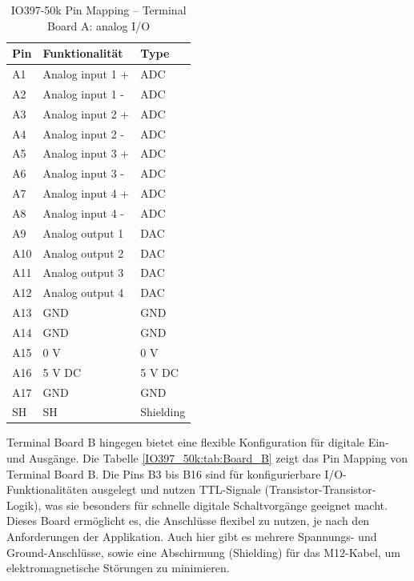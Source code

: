 \pagebreak[1]
\begin{table}[!ht]
	\centering
	\caption{IO397-50k Pin Mapping – Terminal Board A: analog I/O \cite{speedgoat:IO397_50k}}
	\label{IO397_50k:tab:Board_A}
	\begin{tabular}{lll}
		\hline
		\textbf{Pin}             & \textbf{Funktionalität} & \textbf{Type} \\ \hline
		\multicolumn{1}{l|}{A1}  & Analog input 1 +        & ADC           \\
		\multicolumn{1}{l|}{A2}  & Analog input 1 -        & ADC           \\
		\multicolumn{1}{l|}{A3}  & Analog input 2 +        & ADC           \\
		\multicolumn{1}{l|}{A4}  & Analog input 2 -        & ADC           \\
		\multicolumn{1}{l|}{A5}  & Analog input 3 +        & ADC           \\
		\multicolumn{1}{l|}{A6}  & Analog input 3 -        & ADC           \\
		\multicolumn{1}{l|}{A7}  & Analog input 4 +        & ADC           \\
		\multicolumn{1}{l|}{A8}  & Analog input 4 -        & ADC           \\ \hline
		\multicolumn{1}{l|}{A9}  & Analog output 1         & DAC           \\
		\multicolumn{1}{l|}{A10} & Analog output 2         & DAC           \\
		\multicolumn{1}{l|}{A11} & Analog output 3         & DAC           \\
		\multicolumn{1}{l|}{A12} & Analog output 4         & DAC           \\ \hline
		\multicolumn{1}{l|}{A13} & GND                     & GND           \\
		\multicolumn{1}{l|}{A14} & GND                     & GND           \\
		\multicolumn{1}{l|}{A15} & 0 V                     & 0 V           \\
		\multicolumn{1}{l|}{A16} & 5 V DC                  & 5 V DC        \\
		\multicolumn{1}{l|}{A17} & GND                     & GND           \\
		\multicolumn{1}{l|}{SH}  & SH                      & Shielding     \\ \hline
	\end{tabular}
\end{table}
\pagebreak[1]


Terminal Board B hingegen bietet eine flexible Konfiguration für digitale Ein- und Ausgänge. Die Tabelle \ref{IO397_50k:tab:Board_B} zeigt das Pin Mapping von Terminal Board B. Die Pins B3 bis B16 sind für konfigurierbare I/O-Funktionalitäten ausgelegt und nutzen TTL-Signale (Transistor-Transistor-Logik), was sie besonders für schnelle digitale Schaltvorgänge geeignet macht. Dieses Board ermöglicht es, die Anschlüsse flexibel zu nutzen, je nach den Anforderungen der Applikation. Auch hier gibt es mehrere Spannungs- und Ground-Anschlüsse, sowie eine Abschirmung (Shielding) für das M12-Kabel, um elektromagnetische Störungen zu minimieren.


